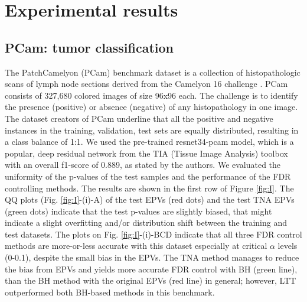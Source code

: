 \documentclass{article}
\begin{document}
\section{Experimental results}

\subsection{PCam: tumor classification}



The PatchCamelyon (PCam) benchmark dataset is a collection of histopathologic scans of lymph node sections \cite{Veeling2018-qh} derived from the Camelyon 16 challenge \cite{camelyon16}. PCam consists of 327,680 colored images of size 96x96 each. The challenge is to identify the presence (positive) or absence (negative) of any histopathology in one image. The dataset creators of PCam underline that all the positive and negative instances in the training, validation, test sets are equally distributed, resulting in a class balance of 1:1. We used the pre-trained resnet34-pcam model, which is a popular, deep residual network from the TIA (Tissue Image Analysis) toolbox \cite{Pocock2022} with an overall f1-score of 0.889, as stated by the authors. We evaluated the uniformity of the p-values of the test samples and the performance of the FDR controlling methods. The results are shown in the first row of Figure \ref{fig:I}.  The QQ plots (Fig. \ref{fig:I}-(i)-A) of the test EPVs (red dots) and the test TNA EPVs (green dots) indicate that the test p-values are slightly biased, that might indicate a slight overfitting and/or distribution shift between the training and test datasets. The plots on Fig. \ref{fig:I}-(i)-BCD indicate that all three FDR control methods are more-or-less accurate with this dataset especially at critical $\alpha$ levels (0-0.1), despite the small bias in the EPVs. The TNA method manages to reduce the bias from EPVs and yields more accurate FDR control with BH (green line), than the BH method with the original EPVs (red line) in general; however, LTT outperformed both BH-based methods in this benchmark. 
\end{document}
